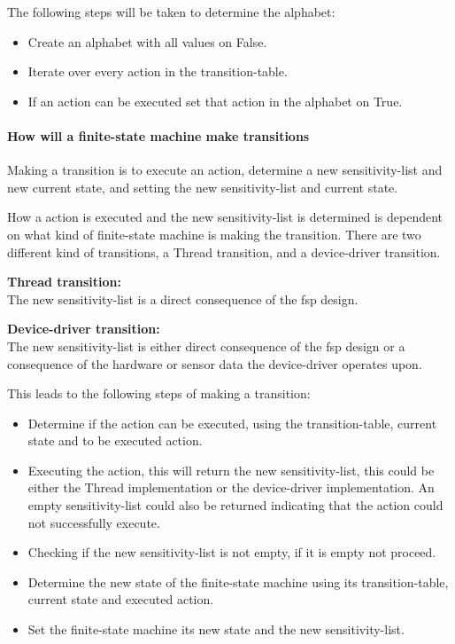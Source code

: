 The following steps will be taken to determine the alphabet:

\begin{itemize}
\tightlist
\item
  Create an alphabet with all values on False.
\item
  Iterate over every action in the transition-table.
\item
  If an action can be executed set that action in the alphabet on True.
\end{itemize}

\hypertarget{how-will-a-finite-state-machine-make-transitions}{%
\paragraph{How will a finite-state machine make
transitions}\label{how-will-a-finite-state-machine-make-transitions}}

Making a transition is to execute an action, determine a new
sensitivity-list and new current state, and setting the new
sensitivity-list and current state.

How a action is executed and the new sensitivity-list is determined is
dependent on what kind of finite-state machine is making the transition.
There are two different kind of transitions, a Thread transition, and a
device-driver transition.

\textbf{Thread transition:}\\
The new sensitivity-list is a direct consequence of the fsp design.

\textbf{Device-driver transition:}\\
The new sensitivity-list is either direct consequence of the fsp design
or a consequence of the hardware or sensor data the device-driver
operates upon.

This leads to the following steps of making a transition:

\begin{itemize}
\tightlist
\item
  Determine if the action can be executed, using the transition-table,
  current state and to be executed action.
\item
  Executing the action, this will return the new sensitivity-list, this
  could be either the Thread implementation or the device-driver
  implementation. An empty sensitivity-list could also be returned
  indicating that the action could not successfully execute.
\item
  Checking if the new sensitivity-list is not empty, if it is empty not
  proceed.
\item
  Determine the new state of the finite-state machine using its
  transition-table, current state and executed action.
\item
  Set the finite-state machine its new state and the new
  sensitivity-list.
\end{itemize}
